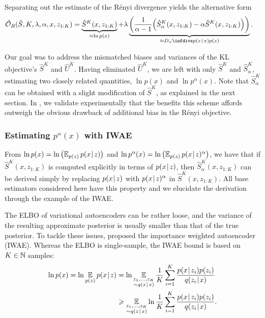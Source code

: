 \noindent Separating out the estimate of the Rényi divergence yields the alternative form
\begin{align}
\label{eq:renyi-obj-estimator-alt}
\mathcal{\hat{O}}_{R}(\hat{S}, K, \lambda, \alpha, x, z_{1:K})
&= \underbrace{\hat{S}^K(x, z_{1:K})}_{\approx \ln p(x)}
   + \lambda \underbrace{ \biggl( \frac{1}{\alpha-1}
                                 \Bigl( \hat{S}^K_\alpha(x,z_{1:K}) -
                                       \alpha \hat{S}^K(x,z_{1:K}) \Bigr)
                          \biggr)
                        }_{\approx D_\alpha\Div{p(z\tmid x)}{p(z)}}.
\end{align}

Our goal was to address the mismatched biases and variances of the KL objective's $\hat{S}^K$ and $\hat{U}^K$.
Having eliminated $\hat{U}^K$, we are left with only $\hat{S}^K$ and $\hat{S}^K_\alpha$, estimating two closely related quantities, $\ln p(x)$ and $\ln p^\alpha(x)$.
Note that $\hat{S}^K_\alpha$ can be obtained with a slight modification of $\hat{S}^K$, as explained in the next section.
In , we validate experimentally that the benefits this scheme affords outweigh the obvious drawback of additional bias in the Rényi objective.

\subsubsection{Estimating \texorpdfstring{$p^\alpha(x)$}{palpha(x)} with IWAE}

From $\ln p(x) = \ln\left(\mathop{{}\mathbb{E}}_{p(z)} p(x\hspace{0.08em}|\hspace{0.11em} z)\right)$ and $\ln p^\alpha(x) = \ln \left(\mathop{{}\mathbb{E}}_{p(z)} p(x\hspace{0.08em}|\hspace{0.11em} z)^\alpha\right)$, we have that if $\hat{S}^K(x,z_{1:K})$ is computed explicitly in terms of $p(x\hspace{0.08em}|\hspace{0.11em} z)$, then $\hat{S}^K_\alpha(x,z_{1:K})$ can be derived simply by replacing $p(x\hspace{0.08em}|\hspace{0.11em} z)$ with $p(x\hspace{0.08em}|\hspace{0.11em} z)^\alpha$ in $\hat{S}^K(x, z_{1:K})$.
All base estimators considered here have this property and we elucidate the derivation through the example of the IWAE.

The ELBO of variational autoencoders can be rather loose, and the variance of the resulting approximate posterior is usually smaller than that of the true posterior.
To tackle these issues, \cite{burda2015importance} proposed the importance weighted autoencoder (IWAE).
Whereas the ELBO is single-sample, the IWAE bound is based on $K \in \mathbb{N}$ samples:
\begin{align*}
\ln p(x)
= \ln \mathop{{}\mathbb{E}}_{p(z)} p(x\hspace{0.08em}|\hspace{0.11em} z)
&= \ln \mathop{{}\mathbb{E}}_{\substack{z_1,\ldots, z_K\\ \sim q(z\hspace{0.08em}|\hspace{0.11em} x)}}
  \frac{1}{K} \sum_{i=1}^K \frac{p(x\hspace{0.08em}|\hspace{0.11em} z_i)p(z_i)}{q(z_i\hspace{0.08em}|\hspace{0.11em} x)}\\
&\geqslant \mathop{{}\mathbb{E}}_{\substack{z_1,\ldots, z_K\\ \sim q(z\hspace{0.08em}|\hspace{0.11em} x)}}
  \ln \frac{1}{K} \sum_{i=1}^K \frac{p(x\hspace{0.08em}|\hspace{0.11em} z_i)p(z_i)}{q(z_i\hspace{0.08em}|\hspace{0.11em} x)}.
\end{align*}

